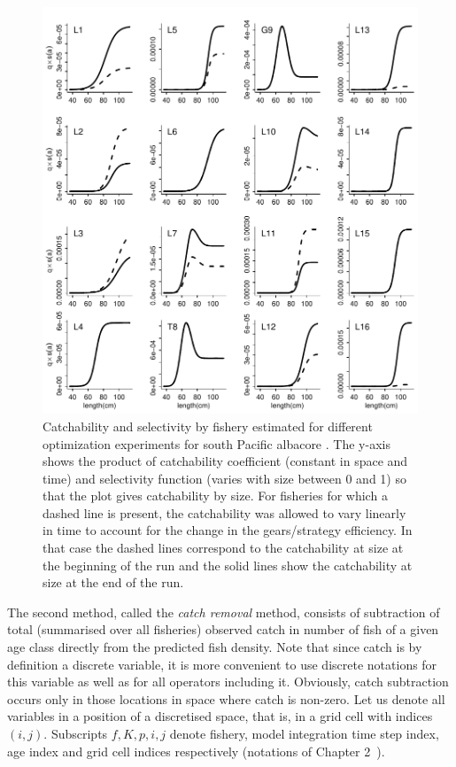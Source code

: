 \begin{figure}[htbp]
	\centering
		\includegraphics[width=1.00\textwidth]{chapter1/figs/plots_sq}
	\caption{Catchability and selectivity by fishery estimated for different optimization experiments for south Pacific albacore \citep*[from][]{Senina2020a}. The y-axis shows the product of catchability coefficient (constant in space and time) and selectivity function (varies with size between 0 and 1) so that the plot gives catchability by size. For fisheries for which a dashed line is present, the catchability was allowed to vary linearly in time to account for the change in the gears/strategy efficiency. In that case the dashed lines correspond to the catchability at size at the beginning of the run and the solid lines show the catchability at size at the end of the run.}
	\label{fig:sq-plots}
\end{figure}

The second method, called the \textit{catch removal} method, consists of subtraction of total (summarised over all fisheries) observed catch in number of fish of a given age class directly from the predicted fish density. Note that since catch is by definition a discrete variable, it is more convenient to use discrete notations for this variable as well as for all operators including it. Obviously, catch subtraction occurs only in those locations in space where catch is non-zero. Let us denote all variables in a position of a discretised space, that is, in a grid cell with indices $(i,j)$. 
Subscripts $f,K,p,i,j$ denote fishery, model integration time step index, age index and grid cell indices respectively (notations of Chapter 2~{}).

